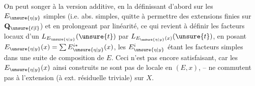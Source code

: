 On peut songer à la version additive, en la définissant d'abord sur les $E_{\unsure{\eta|y}}$ simples (i.e. abs. simples, quitte à permettre des extensions finies sur $\mathbf{Q}_{\unsure{\ell|l}}$) et en prolongeant par linéarité, ce qui revient à définir les facteurs locaux d'un $L_{E_{\unsure{\eta|y}}}(\unsure{t})$ par $L_{E_{\unsure{\eta|y}}(x)}(\unsure{t})$, en posant $E_{\unsure{\eta|y}}(x)=\sum E_{\unsure{\eta|y}}^{i*}(x)$, les $E_{\unsure{\eta|y}}^i$ étant les facteurs simples dans une suite de composition de $E$. Ceci n'est pas encore satisfaisant, car les $E_{\unsure{\eta|y}}(x)$ ainsi construits ne sont pas de  locale en $(E,x)$, --  ne commutent pas à l'extension   (à ext. résiduelle   triviale) sur $X$.


